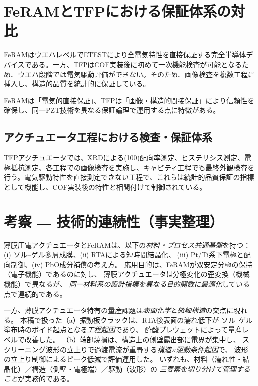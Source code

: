 \documentclass[conference]{IEEEtran}
\begin{document}
\section{FeRAMとTFPにおける保証体系の対比}
FeRAMはウエハレベルでETESTにより全電気特性を直接保証する完全半導体デバイスである。一方、TFPはCOF実装後に初めて一次機能検査が可能となるため、ウエハ段階では電気駆動評価ができない。そのため、画像検査を複数工程に挿入し、構造的品質を統計的に保証している。

FeRAMは「電気的直接保証」、TFPは「画像・構造的間接保証」により信頼性を確保し、同一PZT技術を異なる保証論理で運用する点に特徴がある。

\subsection{アクチュエータ工程における検査・保証体系}
TFPアクチュエータでは、XRDによる(100)配向率測定、ヒステリシス測定、電極抵抗測定、各工程での画像検査を実施し、キャビティ工程でも最終外観検査を行う。電気駆動特性を直接測定できない工程で、これらは統計的品質保証の指標として機能し、COF実装後の特性と相関付けて制御されている。

\section{考察 ― 技術的連続性（事実整理）}
薄膜圧電アクチュエータとFeRAMは、以下の\emph{材料・プロセス共通基盤}を持つ：
(i) ソル–ゲル多層成膜、(ii) RTAによる短時間結晶化、
(iii) Pt/Ti系下電極と配向制御、(iv) PbO成分補償の考え方\cite{bottaro1993solgel,scott2000review,damjanovic2010ferro}。
応用目的は、FeRAMが双安定分極の保持（電子機能）であるのに対し、
薄膜アクチュエータは分極変化の歪変換（機械機能）で異なるが、
\emph{同一材料系の設計指標を異なる目的関数に最適化}している点で連続的である。

一方、薄膜アクチュエータ特有の量産課題は\emph{表面化学と微細構造}の交点に現れる。
本稿で扱った（a）振動板クラックは、RTA後表面の濡れ低下が
ソル–ゲル塗布時のボイド起点となる\emph{工程起因}であり、
酢酸プレウェットによって量産レベルで改善した。
（b）端部焼損は、構造上の側壁露出部に電界が集中し、
スクリーニング波形の立上りで過渡電流が重畳する\emph{構造×駆動条件起因}で、
波形の立上り制御によるピーク低減で評価運用した。
いずれも、材料（濡れ性・結晶化）／構造（側壁・電極端）／駆動（波形）の
\emph{三要素を切り分けて管理すること}が実務的である。

\end{document}
